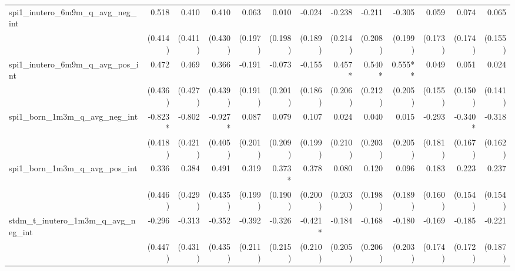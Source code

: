 \begin{tabular}{lrrrrrrrrrrrr}
spi1\_inutero\_6m9m\_q\_avg\_neg\_int       &        0.518 &        0.410 &        0.410 &        0.063 &        0.010 &       -0.024 &       -0.238 &       -0.211 &       -0.305 &        0.059 &        0.074 &        0.065 \\ 
                                            &      (0.414) &      (0.411) &      (0.430) &      (0.197) &      (0.198) &      (0.189) &      (0.214) &      (0.208) &      (0.199) &      (0.173) &      (0.174) &      (0.155) \\ 
spi1\_inutero\_6m9m\_q\_avg\_pos\_int       &        0.472 &        0.469 &        0.366 &       -0.191 &       -0.073 &       -0.155 &       0.457* &       0.540* &      0.555** &        0.049 &        0.051 &        0.024 \\ 
                                            &      (0.436) &      (0.427) &      (0.439) &      (0.191) &      (0.201) &      (0.186) &      (0.206) &      (0.212) &      (0.205) &      (0.155) &      (0.150) &      (0.141) \\ 
spi1\_born\_1m3m\_q\_avg\_neg\_int          &      -0.823* &       -0.802 &      -0.927* &        0.087 &        0.079 &        0.107 &        0.024 &        0.040 &        0.015 &       -0.293 &      -0.340* &       -0.318 \\ 
                                            &      (0.418) &      (0.421) &      (0.405) &      (0.201) &      (0.209) &      (0.199) &      (0.210) &      (0.203) &      (0.205) &      (0.181) &      (0.167) &      (0.162) \\ 
spi1\_born\_1m3m\_q\_avg\_pos\_int          &        0.336 &        0.384 &        0.491 &        0.319 &       0.373* &        0.378 &        0.080 &        0.120 &        0.096 &        0.183 &        0.223 &        0.237 \\ 
                                            &      (0.446) &      (0.429) &      (0.435) &      (0.199) &      (0.190) &      (0.200) &      (0.203) &      (0.198) &      (0.189) &      (0.160) &      (0.154) &      (0.154) \\ 
stdm\_t\_inutero\_1m3m\_q\_avg\_neg\_int    &       -0.296 &       -0.313 &       -0.352 &       -0.392 &       -0.326 &      -0.421* &       -0.184 &       -0.168 &       -0.180 &       -0.169 &       -0.185 &       -0.221 \\ 
                                            &      (0.447) &      (0.431) &      (0.435) &      (0.211) &      (0.215) &      (0.210) &      (0.205) &      (0.206) &      (0.203) &      (0.174) &      (0.172) &      (0.187) \\ 

\end{tabular}
